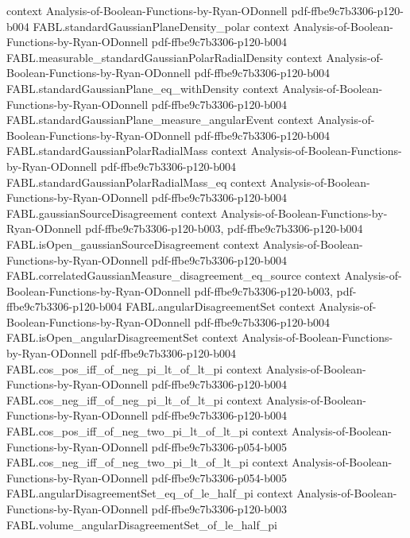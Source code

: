 \begin{theorem}
  {context}
  {Analysis-of-Boolean-Functions-by-Ryan-ODonnell}
  {pdf-ffbe9c7b3306-p120-b004}
\proofstep
  {FABL.standardGaussianPlaneDensity_polar}
  {context}
  {Analysis-of-Boolean-Functions-by-Ryan-ODonnell}
  {pdf-ffbe9c7b3306-p120-b004}
\proofstep
  {FABL.measurable_standardGaussianPolarRadialDensity}
  {context}
  {Analysis-of-Boolean-Functions-by-Ryan-ODonnell}
  {pdf-ffbe9c7b3306-p120-b004}
\proofstep
  {FABL.standardGaussianPlane_eq_withDensity}
  {context}
  {Analysis-of-Boolean-Functions-by-Ryan-ODonnell}
  {pdf-ffbe9c7b3306-p120-b004}
\proofstep
  {FABL.standardGaussianPlane_measure_angularEvent}
  {context}
  {Analysis-of-Boolean-Functions-by-Ryan-ODonnell}
  {pdf-ffbe9c7b3306-p120-b004}
\proofstep
  {FABL.standardGaussianPolarRadialMass}
  {context}
  {Analysis-of-Boolean-Functions-by-Ryan-ODonnell}
  {pdf-ffbe9c7b3306-p120-b004}
\proofstep
  {FABL.standardGaussianPolarRadialMass_eq}
  {context}
  {Analysis-of-Boolean-Functions-by-Ryan-ODonnell}
  {pdf-ffbe9c7b3306-p120-b004}
\proofstep
  {FABL.gaussianSourceDisagreement}
  {context}
  {Analysis-of-Boolean-Functions-by-Ryan-ODonnell}
  {pdf-ffbe9c7b3306-p120-b003,
    pdf-ffbe9c7b3306-p120-b004}
\proofstep
  {FABL.isOpen_gaussianSourceDisagreement}
  {context}
  {Analysis-of-Boolean-Functions-by-Ryan-ODonnell}
  {pdf-ffbe9c7b3306-p120-b004}
\proofstep
  {FABL.correlatedGaussianMeasure_disagreement_eq_source}
  {context}
  {Analysis-of-Boolean-Functions-by-Ryan-ODonnell}
  {pdf-ffbe9c7b3306-p120-b003,
    pdf-ffbe9c7b3306-p120-b004}
\proofstep
  {FABL.angularDisagreementSet}
  {context}
  {Analysis-of-Boolean-Functions-by-Ryan-ODonnell}
  {pdf-ffbe9c7b3306-p120-b004}
\proofstep
  {FABL.isOpen_angularDisagreementSet}
  {context}
  {Analysis-of-Boolean-Functions-by-Ryan-ODonnell}
  {pdf-ffbe9c7b3306-p120-b004}
\proofstep
  {FABL.cos_pos_iff_of_neg_pi_lt_of_lt_pi}
  {context}
  {Analysis-of-Boolean-Functions-by-Ryan-ODonnell}
  {pdf-ffbe9c7b3306-p120-b004}
\proofstep
  {FABL.cos_neg_iff_of_neg_pi_lt_of_lt_pi}
  {context}
  {Analysis-of-Boolean-Functions-by-Ryan-ODonnell}
  {pdf-ffbe9c7b3306-p120-b004}
\proofstep
  {FABL.cos_pos_iff_of_neg_two_pi_lt_of_lt_pi}
  {context}
  {Analysis-of-Boolean-Functions-by-Ryan-ODonnell}
  {pdf-ffbe9c7b3306-p054-b005}
\proofstep
  {FABL.cos_neg_iff_of_neg_two_pi_lt_of_lt_pi}
  {context}
  {Analysis-of-Boolean-Functions-by-Ryan-ODonnell}
  {pdf-ffbe9c7b3306-p054-b005}
\proofstep
  {FABL.angularDisagreementSet_eq_of_le_half_pi}
  {context}
  {Analysis-of-Boolean-Functions-by-Ryan-ODonnell}
  {pdf-ffbe9c7b3306-p120-b003}
\proofstep
  {FABL.volume_angularDisagreementSet_of_le_half_pi}

\end{theorem}
